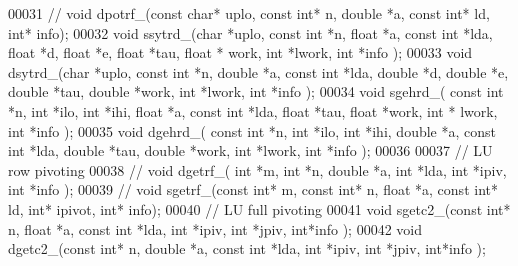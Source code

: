 \begin{DoxyCode}
00031 \textcolor{comment}{//   void dpotrf\_(const char* uplo, const int* n, double *a, const int* ld, int* info);}
00032   \textcolor{keywordtype}{void} ssytrd\_(\textcolor{keywordtype}{char} *uplo, \textcolor{keyword}{const} \textcolor{keywordtype}{int} *n, \textcolor{keywordtype}{float} *a, \textcolor{keyword}{const} \textcolor{keywordtype}{int} *lda, \textcolor{keywordtype}{float} *d, \textcolor{keywordtype}{float} *e, \textcolor{keywordtype}{float} *tau, \textcolor{keywordtype}{float} *
      work, \textcolor{keywordtype}{int} *lwork, \textcolor{keywordtype}{int} *info );
00033   \textcolor{keywordtype}{void} dsytrd\_(\textcolor{keywordtype}{char} *uplo, \textcolor{keyword}{const} \textcolor{keywordtype}{int} *n, \textcolor{keywordtype}{double} *a, \textcolor{keyword}{const} \textcolor{keywordtype}{int} *lda, \textcolor{keywordtype}{double} *d, \textcolor{keywordtype}{double} *e, \textcolor{keywordtype}{double} *tau, \textcolor{keywordtype}{
      double} *work, \textcolor{keywordtype}{int} *lwork, \textcolor{keywordtype}{int} *info );
00034   \textcolor{keywordtype}{void} sgehrd\_( \textcolor{keyword}{const} \textcolor{keywordtype}{int} *n, \textcolor{keywordtype}{int} *ilo, \textcolor{keywordtype}{int} *ihi, \textcolor{keywordtype}{float} *a, \textcolor{keyword}{const} \textcolor{keywordtype}{int} *lda, \textcolor{keywordtype}{float} *tau, \textcolor{keywordtype}{float} *work, \textcolor{keywordtype}{int} *
      lwork, \textcolor{keywordtype}{int} *info );
00035   \textcolor{keywordtype}{void} dgehrd\_( \textcolor{keyword}{const} \textcolor{keywordtype}{int} *n, \textcolor{keywordtype}{int} *ilo, \textcolor{keywordtype}{int} *ihi, \textcolor{keywordtype}{double} *a, \textcolor{keyword}{const} \textcolor{keywordtype}{int} *lda, \textcolor{keywordtype}{double} *tau, \textcolor{keywordtype}{double} *work, \textcolor{keywordtype}{int}
       *lwork, \textcolor{keywordtype}{int} *info );
00036 
00037   \textcolor{comment}{// LU row pivoting}
00038 \textcolor{comment}{//   void dgetrf\_( int *m, int *n, double *a, int *lda, int *ipiv, int *info );}
00039 \textcolor{comment}{//   void sgetrf\_(const int* m, const int* n, float *a, const int* ld, int* ipivot, int* info);}
00040   \textcolor{comment}{// LU full pivoting}
00041   \textcolor{keywordtype}{void} sgetc2\_(\textcolor{keyword}{const} \textcolor{keywordtype}{int}* n, \textcolor{keywordtype}{float} *a, \textcolor{keyword}{const} \textcolor{keywordtype}{int} *lda, \textcolor{keywordtype}{int} *ipiv, \textcolor{keywordtype}{int} *jpiv, \textcolor{keywordtype}{int}*info );
00042   \textcolor{keywordtype}{void} dgetc2\_(\textcolor{keyword}{const} \textcolor{keywordtype}{int}* n, \textcolor{keywordtype}{double} *a, \textcolor{keyword}{const} \textcolor{keywordtype}{int} *lda, \textcolor{keywordtype}{int} *ipiv, \textcolor{keywordtype}{int} *jpiv, \textcolor{keywordtype}{int}*info );

\end{DoxyCode}
